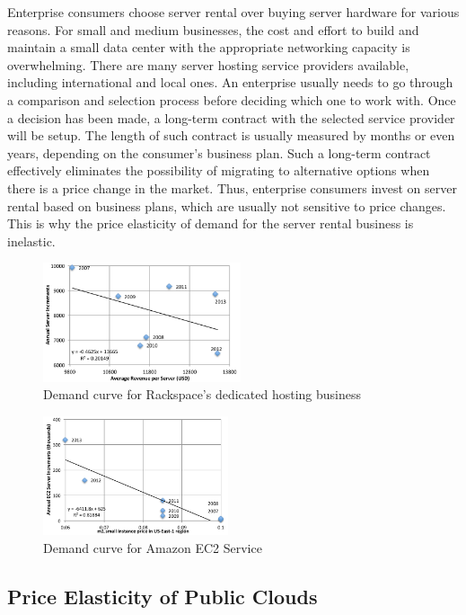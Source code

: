 \documentclass[10pt,journal,cspaper,compsoc]{IEEEtran}
\begin{document}
Enterprise consumers choose server rental over buying server hardware for various reasons. For small and medium businesses, the cost and effort to build and maintain a small data center with the appropriate networking capacity is overwhelming. There are many server hosting service providers available, including international and local ones. An enterprise usually needs to go through a comparison and selection process before deciding which one to work with. Once a decision has been made, a long-term contract with the selected service provider will be setup. The length of such contract is usually measured by months or even years, depending on the consumer's business plan. Such a long-term contract effectively eliminates the possibility of migrating to alternative options when there is a price change in the market. Thus, enterprise consumers invest on server rental based on business plans, which are usually not sensitive to price changes. This is why the price elasticity of demand for the server rental business is inelastic. 

\begin{figure}[t!]
\centering
\includegraphics[height=3.5cm]{fig06}
\caption{Demand curve for Rackspace's dedicated hosting business}
\label{fig:demandRackspace}
\end{figure}

\begin{figure}[t!]
\centering
\includegraphics[height=3.5cm]{fig07}
\caption{Demand curve for Amazon EC2 Service}
\label{fig:demandEC2}
\end{figure}


\subsection{Price Elasticity of Public Clouds}
\end{document}
